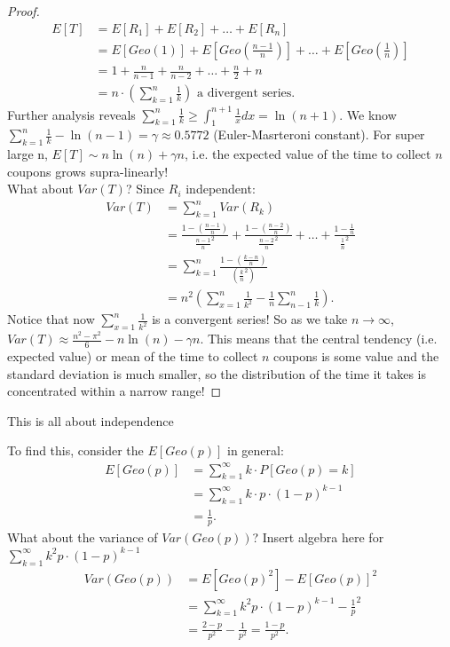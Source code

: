 \documentclass[a4paper]{article}
\begin{document}
\begin{proof}
  \begin{align*}
    E[T] &= E[R_1] + E[R_2] + \ldots + E[R_n] \\
         &= E[Geo(1)] + E[Geo(\frac{n-1}{n})] + \ldots + E[Geo(\frac{1}{n})] \\
         &= 1 + \frac{n}{n-1} + \frac{n}{n-2} + \ldots + \frac{n}{2} + n \\
         &= n \cdot \left( \sum_{k=1}^{n} \frac{1}{k} \right) \text{ a divergent series}
  .\end{align*}
  Further analysis reveals $\sum_{k=1}^{n} \frac{1}{k} \geq \int_{1}^{n+1} \frac{1}{x} dx = \ln(n+1)$. We
  know $\sum_{k=1}^{n} \frac{1}{k} - \ln(n-1) = \gamma \approx 0.5772$ (Euler-Masrteroni constant). For 
  super large n, $E[T] \sim n \ln(n) + \gamma n$, i.e. the expected value of the time to collect $n$ coupons
  grows supra-linearly! \\

  What about $Var(T)$? Since  $R_i$ independent:
  \begin{align*}
    Var(T) &= \sum_{k=1}^{n} Var(R_k) \\
           &= \frac{1-\left( \frac{n-1}{n} \right) }{\frac{n-1}{n}^2} + \frac{1-\left( \frac{n-2}{n} \right)}{
           \frac{n-2}{n}^{2}} + \ldots + \frac{1-\frac{1}{n}}{\frac{1}{n}^2} \\
           &= \sum_{k=1}^{n} \frac{1-\left( \frac{k-n}{n} \right) }{\left( \frac{k}{n}^2 \right) } \\
           &= n^2 \left( \sum_{x=1}^{n} \frac{1}{k^2} - \frac{1}{n} \sum_{n-1}^{n} \frac{1}{k} \right)
  .\end{align*}
  Notice that now $\sum_{x=1}^{n} \frac{1}{k^2}$ is a convergent series! So as we take  $n \to \infty$,
   $Var(T) \approx \frac{n^2 - \pi^2}{6} - n \ln(n) - \gamma n$. This means that the central tendency (i.e.
   expected value) or mean of the time to collect $n$ coupons is some value and the standard deviation 
   is much smaller, so the distribution of the time it takes is concentrated within a narrow range!
 \end{proof}
 This is all about independence

\begin{prop}
   To find this,
  consider the $E[Geo(p)]$ in general:
   \begin{align*}
     E[Geo(p)] &= \sum_{k=1}^{\infty} k \cdot P[Geo(p) = k] \\ 
               &= \sum_{k=1}^{\infty} k \cdot p \cdot \left( 1-p \right)^{k-1} \\
               &= \frac{1}{p}
  .\end{align*}
  What about the variance of $Var(Geo(p))$?
  Insert algebra here for $\sum_{k=1}^{\infty} k^{2} p \cdot (1-p)^{k-1} $
   \begin{align*}
     Var(Geo(p)) &= E[Geo(p)^{2}] - E[Geo(p)]^2 \\
                 &= \sum_{k=1}^{\infty} k^{2} p \cdot (1-p)^{k-1} - \frac{1}{p}^2 \\
                 &= \frac{2-p}{p^{2}} - \frac{1}{p^2} = \frac{1-p}{p^2} 
  .\end{align*}
\end{prop}
\end{document}
